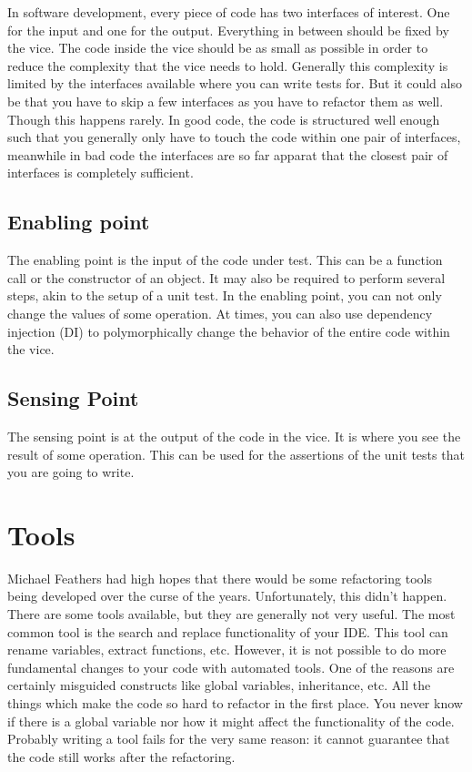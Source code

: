 In software development, every piece of code has two interfaces of interest. One for the input and one for the output. Everything in between should be fixed by the vice. The code inside the vice should be as small as possible in order to reduce the complexity that the vice needs to hold. Generally this complexity is limited by the interfaces available where you can write tests for. But it could also be that you have to skip a few interfaces as you have to refactor them as well. Though this happens rarely. In good code, the code is structured well enough such that you generally only have to touch the code within one pair of interfaces, meanwhile in bad code the interfaces are so far apparat that the closest pair of interfaces is completely sufficient.

\subsection{Enabling point}

The enabling point is the input of the code under test. This can be a function call or the constructor of an object. It may also be required to perform several steps, akin to the setup of a unit test. In the enabling point, you can not only change the values of some operation. At times, you can also use dependency injection (DI) to polymorphically change the behavior of the entire code within the vice.

\subsection{Sensing Point}

The sensing point is at the output of the code in the vice. It is where you see the result of some operation. This can be used for the assertions of the unit tests that you are going to write.




\section{Tools}

Michael Feathers had high hopes that there would be some refactoring tools being developed over the curse of the years. Unfortunately, this didn't happen. There are some tools available, but they are generally not very useful. The most common tool is the search and replace functionality of your IDE. This tool can rename variables, extract functions, etc. However, it is not possible to do more fundamental changes to your code with automated tools. One of the reasons are certainly misguided constructs like global variables, inheritance, etc. All the things which make the code so hard to refactor in the first place. You never know if there is a global variable nor how it might affect the functionality of the code. Probably writing a tool fails for the very same reason: it cannot guarantee that the code still works after the refactoring.

